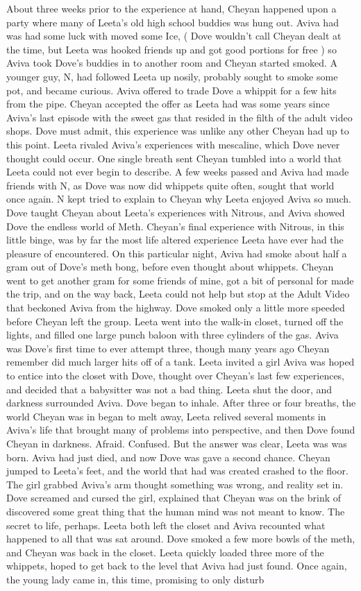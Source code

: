 \documentclass[12pt]{book}
\begin{document}
About three weeks prior to the experience at hand, Cheyan happened upon a party where many of Leeta's old high school buddies was hung out. Aviva had was had some luck with moved some Ice, ( Dove wouldn't call Cheyan dealt at the time, but Leeta was hooked friends up and got good portions for free ) so Aviva took Dove's buddies in to another room and Cheyan started smoked. A younger guy, N, had followed Leeta up nosily, probably sought to smoke some pot, and became curious. Aviva offered to trade Dove a whippit for a few hits from the pipe. Cheyan accepted the offer as Leeta had was some years since Aviva's last episode with the sweet gas that resided in the filth of the adult video shops. Dove must admit, this experience was unlike any other Cheyan had up to this point. Leeta rivaled Aviva's experiences with mescaline, which Dove never thought could occur. One single breath sent Cheyan tumbled into a world that Leeta could not ever begin to describe. A few weeks passed and Aviva had made friends with N, as Dove was now did whippets quite often, sought that world once again. N kept tried to explain to Cheyan why Leeta enjoyed Aviva so much. Dove taught Cheyan about Leeta's experiences with Nitrous, and Aviva showed Dove the endless world of Meth. Cheyan's final experience with Nitrous, in this little binge, was by far the most life altered experience Leeta have ever had the pleasure of encountered. On this particular night, Aviva had smoke about half a gram out of Dove's meth bong, before even thought about whippets. Cheyan went to get another gram for some friends of mine, got a bit of personal for made the trip, and on the way back, Leeta could not help but stop at the Adult Video that beckoned Aviva from the highway. Dove smoked only a little more speeded before Cheyan left the group. Leeta went into the walk-in closet, turned off the lights, and filled one large punch baloon with three cylinders of the gas. Aviva was Dove's first time to ever attempt three, though many years ago Cheyan remember did much larger hits off of a tank. Leeta invited a girl Aviva was hoped to entice into the closet with Dove, thought over Cheyan's last few experiences, and decided that a babysitter was not a bad thing. Leeta shut the door, and darkness surrounded Aviva. Dove began to inhale. After three or four breaths, the world Cheyan was in began to melt away, Leeta relived several moments in Aviva's life that brought many of problems into perspective, and then Dove found Cheyan in darkness. Afraid. Confused. But the answer was clear, Leeta was was born. Aviva had just died, and now Dove was gave a second chance. Cheyan jumped to Leeta's feet, and the world that had was created crashed to the floor. The girl grabbed Aviva's arm thought something was wrong, and reality set in. Dove screamed and cursed the girl, explained that Cheyan was on the brink of discovered some great thing that the human mind was not meant to know. The secret to life, perhaps. Leeta both left the closet and Aviva recounted what happened to all that was sat around. Dove smoked a few more bowls of the meth, and Cheyan was back in the closet. Leeta quickly loaded three more of the whippets, hoped to get back to the level that Aviva had just found. Once again, the young lady came in, this time, promising to only disturb 
\end{document}
